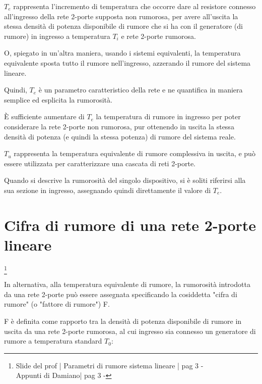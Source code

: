 $T_e$ rappresenta l'incremento di temperatura che occorre dare al resistore connesso all'ingresso della rete 2-porte supposta non rumorosa, 
per avere all'uscita la stessa densità di potenza disponibile di rumore che si ha con il generatore (di rumore) in ingresso a temperatura $T_i$ e rete 2-porte rumorosa. \newline 

O, spiegato in un'altra maniera, usando i sistemi equivalenti, la temperatura equivalente sposta tutto il rumore nell'ingresso, azzerando il rumore del sistema lineare. \newline 

Quindi, $T_e$ è un parametro caratteristico della rete e ne quantifica in maniera semplice ed esplicita la rumorosità. \newline 

È sufficiente aumentare di $T_e$ la temperatura di rumore in ingresso per poter considerare la rete 2-porte non rumorosa, 
pur ottenendo in uscita la stessa densità di potenza (e quindi la stessa potenza) di rumore del sistema reale. \newline 

$T_u$ rappresenta la temperatura equivalente di rumore complessiva in uscita, 
e può essere utilizzata per caratterizzare una cascata di reti 2-porte. \newline 

Quando si descrive la rumorosità del singolo dispositivo, si è soliti riferirsi alla sua sezione in ingresso, assegnando quindi direttamente il valore di $T_e$. \newline 


\newpage 

\section{Cifra di rumore di una rete 2-porte lineare}
\footnote{Slide del prof | Parametri di rumore sistema lineare | pag 3 - \\  
Appunti di Damiano| pag 3 - } 

In alternativa, alla temperatura equivalente di rumore, la rumorosità introdotta da una rete 2-porte può essere assegnata specificando la cosiddetta "cifra di rumore" (o "fattore di rumore") F. \newline 


F è definita come rapporto tra la densità di potenza disponibile di rumore in uscita da una rete 2-porte rumorosa, 
al cui ingresso sia connesso un generatore di rumore a temperatura standard $T_0$: 

